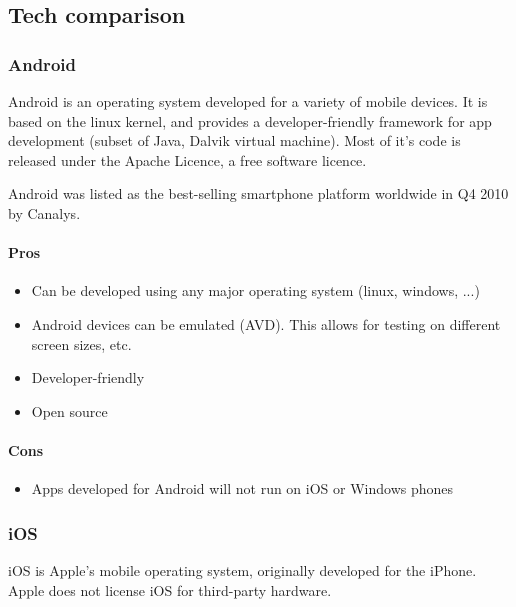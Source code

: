 \subsection{Tech comparison}

\subsubsection{Android}

	Android is an operating system developed for a variety of mobile devices.
	It is based on the linux kernel, and provides a developer-friendly
	framework for app development (subset of Java, Dalvik virtual machine).
	Most of it's code is released under the Apache Licence, a free software
	licence.

	Android was listed as the best-selling smartphone platform worldwide in Q4
	2010 by Canalys. \cite{wiki:android}

	\paragraph{Pros}
		\begin{itemize}
			\item Can be developed using any major operating system (linux, windows, ...)
			\item Android devices can be emulated (AVD). This allows for testing on
			different screen sizes, etc.
			\item Developer-friendly
			\item Open source
		\end{itemize}

	\paragraph{Cons}
		\begin{itemize}
			\item Apps developed for Android will not run on iOS or Windows phones
		\end{itemize}

\subsubsection{iOS}

	iOS is Apple's mobile operating system, originally developed for the
	iPhone. Apple does not license iOS for third-party hardware.

